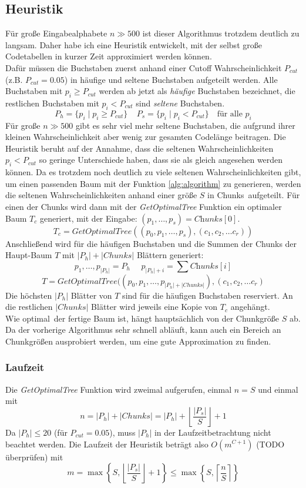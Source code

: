 \documentclass[a4paper,10pt,ngerman]{scrartcl}
\begin{document}
    \subsection{Heuristik}
    Für große Eingabealphabete $n \gg 500$ ist dieser Algorithmus trotzdem deutlich zu langsam.
    Daher habe ich eine Heuristik entwickelt, mit der selbst große Codetabellen in kurzer Zeit approximiert werden können. \\
    Dafür müssen die Buchstaben zuerst anhand einer Cutoff Wahrscheinlichkeit $P_{cut}$ (z.B. $P_{cut} = 0.05$) in häufige und seltene Buchstaben aufgeteilt werden.
    Alle Buchstaben mit $p_i \ge P_{cut}$ werden ab jetzt als \textit{häufige} Buchstaben bezeichnet, die restlichen Buchstaben mit $p_i < P_{cut}$ sind \textit{seltene} Buchstaben.
    \[P_{h} = \{p_i \mid p_i \ge P_{cut}\}~~~~~P_s = \{p_i \mid p_i < P_{cut}\} \text{~~~für alle $p_i$}\]
    Für große $n \gg 500$ gibt es sehr viel mehr seltene Buchstaben, die aufgrund ihrer kleinen Wahrscheinlichkeit aber wenig zur gesamten Codelänge beitragen.
    Die Heuristik beruht auf der Annahme, dass die seltenen Wahrscheinlichkeiten $p_i < P_{cut}$ so geringe Unterschiede haben, dass sie als gleich angesehen werden können.
    Da es trotzdem noch deutlich zu viele seltenen Wahrscheinlichkeiten gibt, um einen passenden Baum mit der Funktion \ref{alg:algorithm} zu generieren, werden die seltenen Wahrscheinlichkeiten anhand einer größe $S$ in \glqq Chunks\grqq~aufgeteilt.
    Für einen der Chunks wird dann mit der \textit{GetOptimalTree} Funktion ein optimaler Baum $T_c$ generiert, mit der Eingabe: $(p_1, \dots, p_s) = \textit{Chunks}[0]$.
    \[T_c = \textit{GetOptimalTree}((p_0, p_1, \dots, p_s), (c_1, c_2, \dots c_r))\]
    Anschließend wird für die häufigen Buchstaben und die Summen der Chunks der Haupt-Baum $T$ mit $|P_h| + |Chunks|$ Blättern generiert:
    \[p_1, \dots, p_{|P_h|} = P_h~~~~~~p_{|P_h| + i} = \sum \textit{Chunks}[i]\]
    \[T = \textit{GetOptimalTree}((p_0, p_1, \dots, p_{|P_h| + |Chunks|}), (c_1, c_2, \dots c_r)\]
    Die höchsten $|P_h|$ Blätter von $T$ sind für die häufigen Buchstaben \glqq reserviert\grqq.
    An die restlichen $|Chunks|$ Blätter wird jeweils eine Kopie von $T_c$ angehängt. \\
    Wie \glqq optimal\grqq~der fertige Baum ist, hängt hauptsächlich von der Chunkgröße $S$ ab.
    Da der vorherige Algorithmus sehr schnell abläuft, kann auch ein Bereich an Chunkgrößen ausprobiert werden, um eine gute Approximation zu finden.
    \subsubsection{Laufzeit}
    Die \textit{GetOptimalTree} Funktion wird zweimal aufgerufen, einmal $n = S$ und einmal mit
    \[n = |P_h| + |Chunks| = |P_h| +  \left\lfloor   \frac {|P_s|} {S}  \right\rfloor + 1\]
    Da $|P_h| \le 20$ (für $P_{cut} = 0.05$), muss $|P_h|$ in der Laufzeitbetrachtung nicht beachtet werden.
    Die Laufzeit der Heuristik beträgt also $O(m^{C+1})$ (TODO überprüfen) mit
    \[m = \max \left\{ S, \left\lfloor   \frac {|P_s|} {S}  \right\rfloor + 1 \right\} \le \max \left\{S, \left\lceil \frac n S \right\rceil \right\}\]
\end{document}

